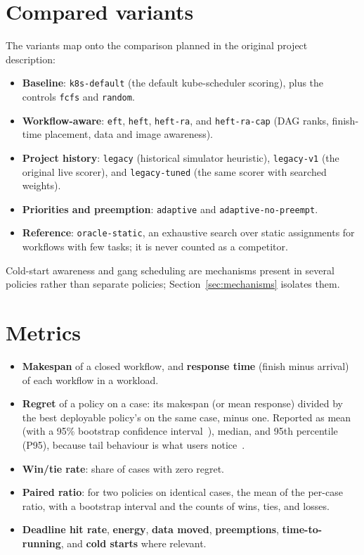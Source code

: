 \documentclass[12pt,a4paper]{report}
\newcommand{\pol}[1]{\texttt{#1}}
\begin{document}
\section{Compared variants}

The variants map onto the comparison planned in the original project
description:

\begin{itemize}
\item \textbf{Baseline}: \pol{k8s-default} (the default kube-scheduler
      scoring), plus the controls \pol{fcfs} and \pol{random}.
\item \textbf{Workflow-aware}: \pol{eft}, \pol{heft}, \pol{heft-ra},
      and \pol{heft-ra-cap} (DAG ranks, finish-time placement, data and
      image awareness).
\item \textbf{Project history}: \pol{legacy} (historical simulator
      heuristic), \pol{legacy-v1} (the original live scorer), and
      \pol{legacy-tuned} (the same scorer with searched weights).
\item \textbf{Priorities and preemption}: \pol{adaptive} and
      \pol{adaptive-no-preempt}.
\item \textbf{Reference}: \pol{oracle-static}, an exhaustive search over
      static assignments for workflows with few tasks; it is never counted
      as a competitor.
\end{itemize}

Cold-start awareness and gang scheduling are mechanisms present in several
policies rather than separate policies; Section~\ref{sec:mechanisms}
isolates them.

\section{Metrics}

\begin{itemize}
\item \textbf{Makespan} of a closed workflow, and \textbf{response time}
      (finish minus arrival) of each workflow in a workload.
\item \textbf{Regret} of a policy on a case: its makespan (or mean
      response) divided by the best deployable policy's on the same case,
      minus one. Reported as mean (with a 95\% bootstrap confidence
      interval~\cite{efron1993bootstrap}), median, and 95th percentile
      (P95), because tail behaviour is what users notice~\cite{dean2013tail}.
\item \textbf{Win/tie rate}: share of cases with zero regret.
\item \textbf{Paired ratio}: for two policies on identical cases, the mean
      of the per-case ratio, with a bootstrap interval and the counts of
      wins, ties, and losses.
\item \textbf{Deadline hit rate}, \textbf{energy}, \textbf{data moved},
      \textbf{preemptions}, \textbf{time-to-running}, and \textbf{cold
      starts} where relevant.
\end{itemize}
\end{document}
